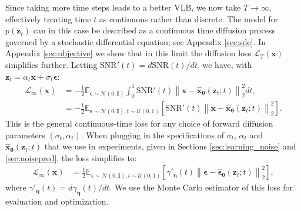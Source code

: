\documentclass{article}
\def\rvx{{\mathbf{x}}}
\def\rvz{{\mathbf{z}}}
\newcommand{\E}{\mathbb{E}}
\newcommand{\bT}{{\boldsymbol{\theta}}}
\newcommand{\boldeta}{{\boldsymbol{\eta}}}
\newcommand{\bfI}{\mathbf{I}}
\newcommand{\bepsilon}{{\boldsymbol{\epsilon}}}
\newcommand{\lT}{\mathcal{L}_T(\rvx)}
\newcommand{\linfty}{\mathcal{L}_{\infty}(\rvx)}
\newcommand{\snr}{\text{SNR}}
\begin{document}
Since taking more time steps leads to a better VLB, we now take $T\rightarrow\infty$, effectively treating time $t$ as continuous rather than discrete. The model for $p(\rvz_t)$ can in this case be described as a continuous time diffusion process \citep{song2020score} governed by a stochastic differential equation; see Appendix \ref{sec:sde}. In Appendix \ref{sec:objective} we show that in this limit the diffusion loss $\lT$ simplifies further. Letting $\snr'(t) = d \snr(t)/dt$, we have, with $\rvz_t = \alpha_t \rvx + \sigma_t \bepsilon$:
\begin{align}
\linfty
&= -\frac{1}{2}\E_{\bepsilon\sim\mathcal{N}(0,\bfI)} \int_{0}^{1} \snr'(t) \left\rVert \rvx - \hat{\rvx}_{\bT}(\rvz_t;t) \right\lVert_{2}^{2} dt, \label{eq:fusion_integral}
\\
&= -\frac{1}{2}\E_{\bepsilon\sim\mathcal{N}(0,\bfI), t \sim \mathcal{U}(0,1)}
\left[ \snr'(t) \left\rVert \rvx - \hat{\rvx}_{\bT}(\rvz_t;t) \right\lVert_{2}^{2} \right].
\label{eq:fusion}\end{align}
This is the general continuous-time loss for any choice of forward diffusion parameters $(\sigma_t,  \alpha_t)$. When plugging in the specifications of $\sigma_t$, $\alpha_t$ and $\hat{\rvx}_{\bT}(\rvz_t; t)$ that we use in experiments, given in Sections \ref{sec:learning_noise} and \ref{sec:noisepred}, the loss simplifies to:
\begin{align}
\linfty
&= \frac{1}{2}\E_{\bepsilon\sim\mathcal{N}(0,\bfI), t \sim \mathcal{U}(0,1)}
\left[ \gamma'_{\boldeta}(t) \left\rVert \bepsilon - \hat{\bepsilon}_{\bT}(\rvz_t;t) \right\lVert_{2}^{2} \right],
\end{align}
where $\gamma'_{\boldeta}(t) = d \gamma_{\boldeta}(t)/dt$. We use the Monte Carlo estimator of this loss for evaluation and optimization.
\end{document}
